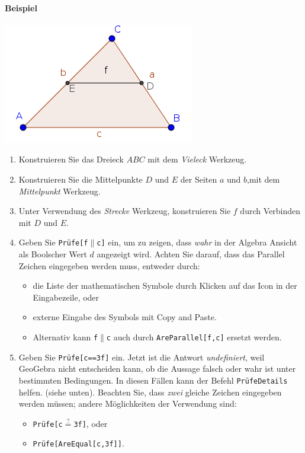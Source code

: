\documentclass{article}
\begin{document}
\paragraph{Beispiel}
\begin{center}
\includegraphics[scale=0.5]{Prove-example}
\end{center}
\begin{enumerate}
\item Konstruieren Sie das Dreieck $ABC$ mit dem \textit{Vieleck} Werkzeug.
\item Konstruieren Sie die Mittelpunkte $D$ und $E$ der Seiten $a$ und $b$,mit dem \textit{Mittelpunkt} Werkzeug.
\item Unter Verwendung des \textit{Strecke} Werkzeug, konstruieren Sie $f$ durch Verbinden mit $D$ und $E$.
\item Geben Sie \texttt{Prüfe[f$\parallel$c]} ein, um zu zeigen, dass \textit{wahr} in der Algebra Ansicht als Boolscher Wert $d$ angezeigt wird. Achten Sie darauf, dass das Parallel Zeichen eingegeben werden muss, entweder durch:
\begin{itemize}
\item die Liste der mathematischen Symbole durch Klicken auf das \framebox{$\alpha$} Icon in der Eingabezeile, oder
\item externe Eingabe des Symbols mit Copy and Paste.
\item Alternativ kann \texttt{f$\parallel$c} auch durch \texttt{AreParallel[f,c]} ersetzt werden.
\end{itemize}

\item Geben Sie \texttt{Prüfe[c==3f]} ein. Jetzt ist die Antwort \textit{undefiniert}, weil GeoGebra nicht entscheiden kann, ob die Aussage falsch oder wahr ist unter bestimmten Bedingungen. In diesen Fällen kann der Befehl \texttt{PrüfeDetails} helfen. (siehe unten). Beachten Sie, dass \textit{zwei} gleiche Zeichen eingegeben werden müssen; andere Möglichkeiten der Verwendung sind:
\begin{itemize}
    \item \texttt{Prüfe[c$\stackrel{?}{=}$3f]}, oder
    \item \texttt{Prüfe[AreEqual[c,3f]]}.
\end{itemize}

\end{enumerate}
\end{document}
